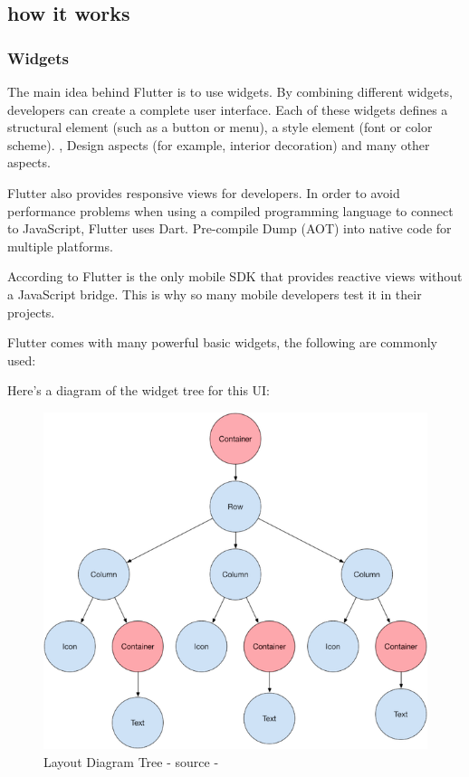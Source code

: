 \subsection{how it works}
\subsubsection{Widgets}
The main idea behind Flutter is to use widgets. By combining different widgets, developers can create a complete user interface. Each of these widgets defines a structural element (such as a button or menu), a style element (font or color scheme). , Design aspects (for example, interior decoration) and many other aspects.

Flutter also provides responsive views for developers. In order to avoid performance problems when using a compiled programming language to connect to JavaScript, Flutter uses Dart. Pre-compile Dump (AOT) into native code for multiple platforms.

According to \cite{WhatisFlutter-Benefits:online} Flutter is the only mobile SDK that provides reactive views without a JavaScript bridge. This is why so many mobile developers test it in their projects.

Flutter comes with many powerful basic widgets, the following are commonly used:

Here’s a diagram of the widget tree for this UI:
\begin{figure}[!htb]
    \centering
    \includegraphics[scale=0.45]{img/layoutDiagramtree.png}
    \caption{Layout Diagram Tree - source - \cite{FDevLayouts:online}}
    \label{fig:Layout Diagram Tree}
\end{figure}

